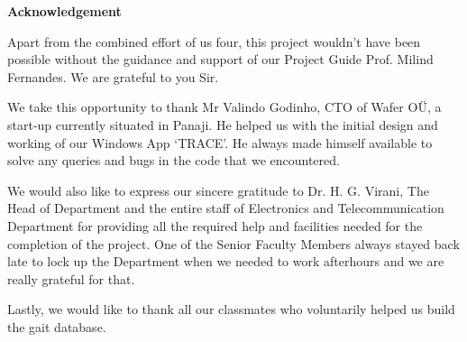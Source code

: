 \begin{center}
\begin{huge}
\bfseries{Acknowledgement}\\
\end{huge}
\end{center}
\vspace{1cm}

\noindent Apart from the combined effort of us four, this project wouldn’t have been possible without the guidance and support of our Project Guide Prof. Milind Fernandes. We are grateful to you Sir.

\noindent We take this opportunity to thank Mr Valindo Godinho, CTO of Wafer OÜ, a start-up currently situated in Panaji. He helped us with the initial design and working of our Windows App ‘TRACE’. He always made himself available to solve any queries and bugs in the code that we encountered.

\noindent We would also like to express our sincere gratitude to Dr. H. G. Virani, The Head of Department and the entire staff of Electronics and Telecommunication Department for providing all the required help and facilities needed for the completion of the project. One of the Senior Faculty Members always stayed back late to lock up the Department when we needed to work afterhours and we are really grateful for that. 

\noindent Lastly, we would like to thank all our classmates who voluntarily helped us build the gait database. 







